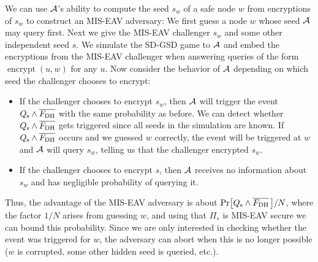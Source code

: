 
We can use $\mathcal{A}$'s ability to compute the seed $s_w$ of a safe node $w$ from encryptions of $s_w$ to construct an MIS-EAV adversary: We first guess a node $w$ whose seed $\mathcal{A}$ may query first. Next we give the MIS-EAV challenger $s_w$ and some other independent seed $s$. We simulate the SD-GSD game to $\mathcal{A}$ and embed the encryptions from the MIS-EAV challenger when answering queries of the form $\operatorname{encrypt}(u, w)$ for any $u$. Now consider the behavior of $\mathcal{A}$ depending on which seed the challenger chooses to encrypt:
\begin{itemize}
	\item If the challenger chooses to encrypt $s_w$, then $\mathcal{A}$ will trigger the event $Q_\mathrm{s} \land \overline{F_\mathrm{DH}}$ with the same probability as before. We can detect whether $Q_\mathrm{s} \land \overline{F_\mathrm{DH}}$ gets triggered since all seeds in the simulation are known. If $Q_\mathrm{s} \land \overline{F_\mathrm{DH}}$ occurs and we guessed $w$ correctly, the event will be triggered at $w$ and $\mathcal{A}$ will query $s_w$, telling us that the challenger encrypted $s_w$.
	\item If the challenger chooses to encrypt $s$, then $\mathcal{A}$ receives no information about $s_w$ and has negligible probability of querying it.
\end{itemize}
Thus, the advantage of the MIS-EAV adversary is about $\pr{\qs \land \overline{\fdh}\,}/N$, where the factor $1/N$ arises from guessing $w$, and using that $\Pi_s$ is MIS-EAV secure we can bound this probability. Since we are only interested in checking whether the event was triggered for $w$, the adversary can abort when this is no longer possible ($w$ is corrupted, some other hidden seed is queried, etc.).

